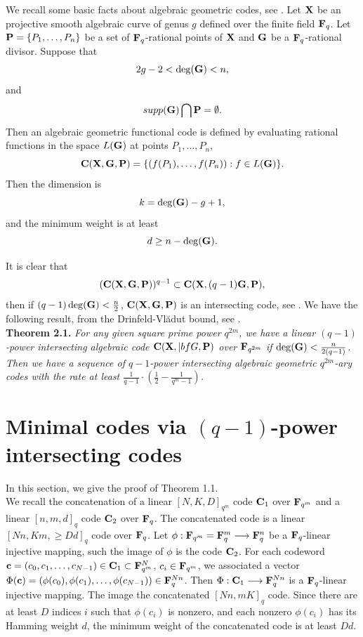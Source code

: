 \documentclass[12pt]{article}
\begin{document}
We recall some basic facts about algebraic geometric codes, see \cite{TV}. Let ${\bf X}$ be an projective smooth algebraic curve of genus $g$ defined over the finite field ${\bf F}_q$. Let ${\bf P}=\{P_1,\ldots, P_n\}$ be a set of ${\bf F}_q$-rational points of ${\bf X}$ and ${\bf G}$ be a ${\bf F}_q$-rational divisor. Suppose that $$2g-2<\deg({\bf G})<n,$$  and $$supp({\bf G}) \bigcap {\bf P}=\emptyset.$$ Then an algebraic geometric functional code is defined by evaluating rational functions in the space $L({\bf G})$ at points $P_1,\ldots, P_n$, $${\bf C}({\bf X}, {\bf G}, {\bf P})=\{(f(P_1), \ldots,f(P_n)): f \in L({\bf G})\}.$$ Then the dimension is $$k=\deg({\bf G})-g+1,$$ and the minimum weight is at least $$d \geq n-\deg({\bf G}).$$


It is clear that $$({\bf C}({\bf X}, {\bf G}, {\bf P}))^{q-1} \subset {\bf C}({\bf X}, (q-1){\bf G}, {\bf P}),$$ then if $(q-1)\deg({\bf G})<\frac{n}{2}$, ${\bf C}({\bf X}, {\bf G}, {\bf P})$ is an intersecting code, see \cite{Borello}. We have the following result, from the Drinfeld-Vl\u{a}dut bound, see \cite{TV}.\\


{\bf Theorem 2.1.} {\em For any given square prime power $q^{2m}$, we have a linear $(q-1)$-power intersecting algebraic code ${\bf C}({\bf X}, {|bf G}, {\bf P})$ over ${\bf F}_{q^{2m}}$ if $\deg({\bf G}) < \frac{n}{2(q-1)}$. Then we have a sequence of $q-1$-power intersecting algebraic geometric $q^{2m}$-ary codes with the rate at least $\frac{1}{q-1} \cdot (\frac{1}{2}-\frac{1}{q^m-1})$.}\\



\section{Minimal codes via $(q-1)$-power intersecting codes}

In this section, we give the proof of Theorem 1.1.\\

We recall the concatenation of a linear $[N, K, D]_{q^m}$ code ${\bf C}_1$ over ${\bf F}_{q^m}$ and a linear $[n, m, d]_q$ code ${\bf C}_2$ over ${\bf F}_q$. The concatenated code is a linear $[Nn,Km, \geq Dd]_q$ code over ${\bf F}_q$. Let $\phi: {\bf F}_{q^m}={\bf F}_q^m \longrightarrow {\bf F}_q^n$ be a ${\bf F}_q$-linear injective mapping, such the image of $\phi$ is the code ${\bf C}_2$. For each codeword ${\bf c}=(c_0, c_1, \ldots, c_{N-1}) \in {\bf C}_1 \subset {\bf F}_{q^m}^N$, $c_i \in {\bf F}_{q^m}$, we associated a vector $\Phi({\bf c})=(\phi(c_0), \phi(c_1), \ldots, \phi(c_{N-1})) \in {\bf F}_q^{Nn}$. Then $\Phi: {\bf C}_1 \longrightarrow {\bf F}_q^{Nn}$ is a ${\bf F}_q$-linear injective mapping. The image the concatenated $[Nn, mK]_q$ code. Since there are at least $D$ indices $i$ such that $\phi(c_i)$ is nonzero, and each nonzero $\phi(c_i)$ has its Hamming weight $d$, the minimum weight of the concatenated code is at least $Dd$.\\
\end{document}
